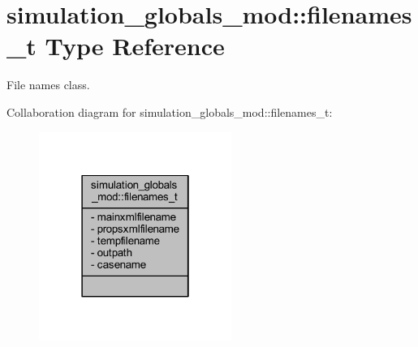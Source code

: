 \hypertarget{structsimulation__globals__mod_1_1filenames__t}{}\section{simulation\+\_\+globals\+\_\+mod\+:\+:filenames\+\_\+t Type Reference}
\label{structsimulation__globals__mod_1_1filenames__t}


File names class.  




Collaboration diagram for simulation\+\_\+globals\+\_\+mod\+:\+:filenames\+\_\+t\+:\nopagebreak
\begin{figure}[H]
\begin{center}
\leavevmode
\includegraphics[width=178pt]{structsimulation__globals__mod_1_1filenames__t__coll__graph}
\end{center}
\end{figure}
